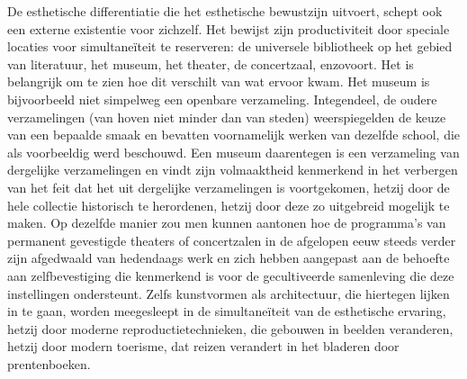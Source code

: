De esthetische differentiatie die het esthetische bewustzijn uitvoert, schept ook een externe existentie voor zichzelf. Het bewijst zijn productiviteit door speciale locaties voor simultaneïteit te reserveren: de universele bibliotheek op het gebied van literatuur, het museum, het theater, de concertzaal, enzovoort. Het is belangrijk om te zien hoe dit verschilt van wat ervoor kwam. Het museum is bijvoorbeeld niet simpelweg een openbare verzameling. Integendeel, de oudere verzamelingen (van hoven niet minder dan van steden) weerspiegelden de keuze van een bepaalde smaak en bevatten voornamelijk werken van dezelfde school, die als voorbeeldig werd beschouwd. Een museum daarentegen is een verzameling van dergelijke verzamelingen en vindt zijn volmaaktheid kenmerkend in het verbergen van het feit dat het uit dergelijke verzamelingen is voortgekomen, hetzij door de hele collectie historisch te herordenen, hetzij door deze zo uitgebreid mogelijk te maken. Op dezelfde manier zou men kunnen aantonen hoe de programma’s van permanent gevestigde theaters of concertzalen in de afgelopen eeuw steeds verder zijn afgedwaald van hedendaags werk en zich hebben aangepast aan de behoefte aan zelfbevestiging die kenmerkend is voor de gecultiveerde samenleving die deze instellingen ondersteunt. Zelfs kunstvormen als architectuur, die hiertegen lijken in te gaan, worden meegesleept in de simultaneïteit van de esthetische ervaring, hetzij door moderne reproductietechnieken, die gebouwen in beelden veranderen, hetzij door modern toerisme, dat reizen verandert in het bladeren door prentenboeken.

